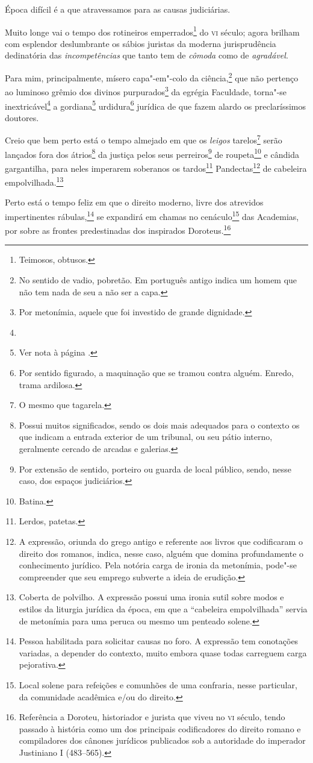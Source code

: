 Época difícil é a que atravessamos para as causas judiciárias.

Muito longe vai o tempo dos rotineiros emperrados\footnote{Teimosos,
  obtusos.} do \textsc{vi} século; agora brilham com esplendor deslumbrante os
sábios juristas da moderna jurisprudência dedinatória das
\emph{incompetências} que tanto tem de \emph{cômoda} como de
\emph{agradável}.

Para mim, principalmente, mísero capa"-em"-colo da ciência,\footnote{No
  sentido de vadio, pobretão. Em português antigo indica um homem que
  não tem nada de seu a não ser a capa.} que não pertenço ao luminoso
grêmio dos divinos purpurados\footnote{Por metonímia, aquele que foi
  investido de grande dignidade.} da egrégia Faculdade, torna"-se
inextricável\footnote{} a gordiana\footnote{Ver nota à página \pageref{gordio}.}
urdidura\footnote{Por sentido figurado, a maquinação que se tramou
  contra alguém. Enredo, trama ardilosa.} jurídica de que fazem alardo
os preclaríssimos doutores.

Creio que bem perto está o tempo almejado em que os \emph{leigos}
tarelos\footnote{O mesmo que tagarela.} serão
lançados fora dos átrios\footnote{Possui muitos significados, sendo os
  dois mais adequados para o contexto os que indicam a entrada exterior
  de um tribunal, ou seu pátio interno, geralmente cercado de arcadas e
  galerias.} da justiça pelos seus perreiros\footnote{Por extensão de
  sentido, porteiro ou guarda de local público, sendo, nesse caso, dos
  espaços judiciários.} de roupeta\footnote{Batina.} e cândida
gargantilha, para neles imperarem soberanos os tardos\footnote{Lerdos,
  patetas.} Pandectas\footnote{A expressão, oriunda do grego antigo e
  referente aos livros que codificaram o direito dos romanos, indica,
  nesse caso, alguém que domina profundamente o conhecimento jurídico.
  Pela notória carga de ironia da metonímia, pode"-se compreender que seu
  emprego subverte a ideia de erudição.} de cabeleira
empolvilhada.\footnote{Coberta de polvilho. A expressão possui uma
  ironia sutil sobre modos e estilos da liturgia jurídica da época, em
que a ``cabeleira empolvilhada'' servia de metonímia para uma peruca ou
  mesmo um penteado solene.}

Perto está o tempo feliz em que o direito moderno, livre dos atrevidos
impertinentes rábulas,\footnote{Pessoa habilitada para solicitar causas
  no foro. A expressão tem conotações variadas, a depender do contexto,
  muito embora quase todas carreguem carga pejorativa.} se expandirá em
chamas no cenáculo\footnote{Local solene para refeições e comunhões de
  uma confraria, nesse particular, da comunidade acadêmica e/ou do
  direito.} das Academias, por sobre as frontes predestinadas dos
inspirados Doroteus.\footnote{Referência a Doroteu, historiador e
  jurista que viveu no \textsc{vi} século, tendo passado à história como um dos
  principais codificadores do direito romano e compiladores dos cânones
  jurídicos publicados sob a autoridade do imperador Justiniano I
  (483--565).}


